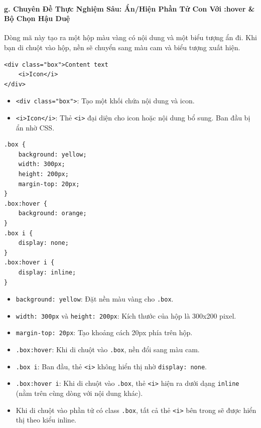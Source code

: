 \documentclass[11pt,oneside]{book}
\newcommand{\codeinline}[1]{\textcolor{accentOrange}{\texttt{#1}}}
\begin{document}
\paragraph{g. Chuyên Đề Thực Nghiệm Sâu: Ẩn/Hiện Phần Tử Con Với :hover \& Bộ Chọn Hậu Duệ}

Dòng mã này tạo ra một hộp màu vàng có nội dung và một biểu tượng ẩn đi. Khi bạn di chuột vào hộp, nền sẽ chuyển sang màu cam và biểu tượng xuất hiện.

\begin{codeWindow}
\begin{lstlisting}[language=HTML5]
<div class="box">Content text
    <i>Icon</i>
</div>
\end{lstlisting}
\end{codeWindow}
\begin{itemize}[leftmargin=1.5em, itemsep=2pt, parsep=0pt]
    \item \codeinline{<div class="box">}: Tạo một khối chứa nội dung và icon.
    \item \codeinline{<i>Icon</i>}: Thẻ \codeinline{<i>} đại diện cho icon hoặc nội dung bổ sung. Ban đầu bị ẩn nhờ CSS.
\end{itemize}

\begin{codeWindow}
\begin{lstlisting}[language=CSS3]
.box {
    background: yellow;
    width: 300px;
    height: 200px;
    margin-top: 20px;
}
.box:hover {
    background: orange;
}
.box i {
    display: none;
}
.box:hover i {
    display: inline;
}
\end{lstlisting}
\end{codeWindow}

\begin{conceptBox}
\begin{itemize}[leftmargin=1.5em, itemsep=3pt, parsep=0pt]
    \item \codeinline{background: yellow}: Đặt nền màu vàng cho \codeinline{.box}.
    \item \codeinline{width: 300px} và \codeinline{height: 200px}: Kích thước của hộp là 300x200 pixel.
    \item \codeinline{margin-top: 20px}: Tạo khoảng cách 20px phía trên hộp.
    \item \codeinline{.box:hover}: Khi di chuột vào \codeinline{.box}, nền đổi sang màu cam.
    \item \codeinline{.box i}: Ban đầu, thẻ \codeinline{<i>} không hiển thị nhờ \codeinline{display: none}.
    \item \codeinline{.box:hover i}: Khi di chuột vào \codeinline{.box}, thẻ \codeinline{<i>} hiện ra dưới dạng \codeinline{inline} (nằm trên cùng dòng với nội dung khác).
    \item Khi di chuột vào phần tử có class \codeinline{.box}, tất cả thẻ \codeinline{<i>} bên trong sẽ được hiển thị theo kiểu inline.
\end{itemize}
\end{conceptBox}
\end{document}
